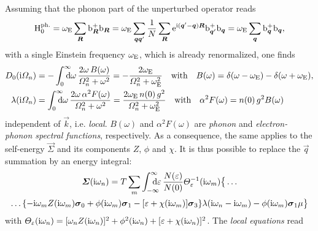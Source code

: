 Assuming that the phonon part of the unperturbed  operator reads
%
\begin{equation*}
    \mathrm H_0 \sp{\text{ph.}}
    = \omega \sb{\text{E}} \sum_{\boldsymbol R} \mathrm b_{\boldsymbol R}^+ \mathrm b_{\boldsymbol R}
    = \omega \sb{\text{E}} \sum_{\boldsymbol q \boldsymbol q'} \frac 1 N \sum_{\boldsymbol R}
        \mathrm e^{\mathrm i (\boldsymbol q' - \boldsymbol q) \boldsymbol R} \mathrm b_{\boldsymbol q'}^+ \mathrm b_{\boldsymbol q}
    = \omega \sb{\text{E}} \sum_{\boldsymbol q} \mathrm b_{\boldsymbol q}^+ \mathrm b_{\boldsymbol q},
\end{equation*}
%
with a single Einstein frequency $\omega \sb{\text{E}}$, which is already renormalized,
one finds
%
\begin{align*}
    D_0(\I \Omega_n) &= -\int \from 0 \till \infty \D \omega \,
        \frac{2 \omega \, B(\omega)}{\Omega_n^2 + \omega^2}
    = -\frac{2 \omega \sub E}{\Omega_n^2 + \omega^2 \sub E}
    \quad \text{with} \quad
    B(\omega) = \delta(\omega - \omega \sub E) - \delta(\omega + \omega \sub E),
    \\
    \lambda(\I \Omega_n) &= \int \from 0 \till \infty \D \omega \,
        \frac{2 \omega \, \alpha^2 F(\omega)}{\Omega_n^2 + \omega^2}
    = \frac{2 \omega \sub E \, n(0) \, g^2}{\Omega_n^2 + \omega^2 \sub E}
    \quad \text{with} \quad
    \alpha^2 F(\omega) = n(0) \, g^2 B(\omega)
\end{align*}
%
independent of $\vec k$, i.e. \emph{local}. $B(\omega)$ and $\alpha^2 F(\omega)$
are \emph{phonon} and \emph{electron-phonon spectral functions}, respectively.
As a consequence, the same applies to the self-energy $\vec \Sigma$ and its
components $Z$, $\phi$ and $\chi$. It is thus possible to replace the $\vec q$
summation by an energy integral:
%
\begin{multline} \label{local self-energy}
    \vec \Sigma(\I \omega_n)
    = T \sum_m \int \from{-\infty} \till \infty \D \epsilon \,
    \frac{N(\epsilon)}{N(0)}
    \Theta_\epsilon^{-1}(\I \omega_m) \big \{ \dots
        \\
        \dots \{
            - \I \omega_m Z(\I \omega_m) \vec \sigma_0
            + \phi(\I \omega_m) \vec \sigma_1
            - [\epsilon + \chi(\I \omega_m)] \vec \sigma_3
            \}
        \lambda(\I \omega_n - \I \omega_m)
        - \phi(\I \omega_m) \vec \sigma_1 \mu
    \big \}
\end{multline}
%
with $\varTheta_\varepsilon(\mathrm i \omega_n) = [\omega_n Z(\mathrm i \omega_n)]^2 + \phi^2(\mathrm i
\omega_n) + [\varepsilon + \chi(\mathrm i \omega_n)]^2$. The \emph{local 
equations} read
%
